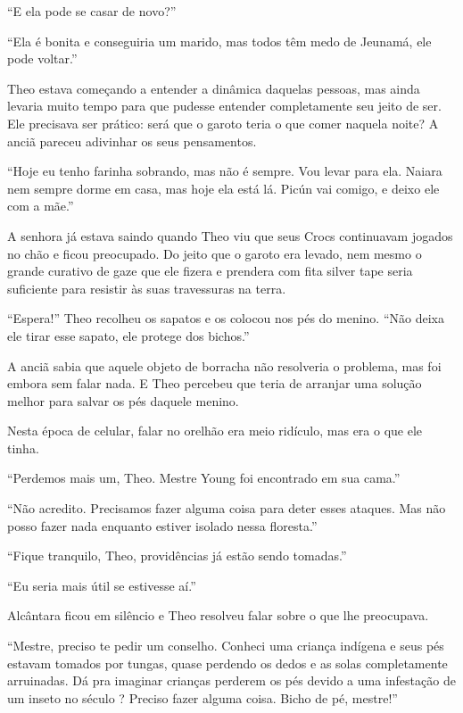 ``E ela pode se casar de novo?''

``Ela é bonita e conseguiria um marido, mas todos têm medo de Jeunamá,
ele pode voltar.''

Theo estava começando a entender a dinâmica daquelas pessoas, mas ainda
levaria muito tempo para que pudesse entender completamente seu jeito de
ser. Ele precisava ser prático: será que o garoto teria o que comer
naquela noite? A anciã pareceu adivinhar os seus pensamentos.

``Hoje eu tenho farinha sobrando, mas não é sempre. Vou levar para ela.
Naiara nem sempre dorme em casa, mas hoje ela está lá. Picún vai comigo,
e deixo ele com a mãe.''

A senhora já estava saindo quando Theo viu que seus Crocs continuavam
jogados no chão e ficou preocupado. Do jeito que o garoto era levado,
nem mesmo o grande curativo de gaze que ele fizera e prendera com fita
silver tape seria suficiente para resistir às suas travessuras na terra.

``Espera!'' Theo recolheu os sapatos e os colocou nos pés do menino.
``Não deixa ele tirar esse sapato, ele protege dos bichos.''

A anciã sabia que aquele objeto de borracha não resolveria o problema,
mas foi embora sem falar nada. E Theo percebeu que teria de arranjar uma
solução melhor para salvar os pés daquele menino.

\asterisc


Nesta época de celular, falar no orelhão era meio ridículo, mas era o
que ele tinha.

``Perdemos mais um, Theo. Mestre Young foi encontrado em sua cama.''

``Não acredito. Precisamos fazer alguma coisa para deter esses ataques.
Mas não posso fazer nada enquanto estiver isolado nessa floresta.''

``Fique tranquilo, Theo, providências já estão sendo tomadas.''

``Eu seria mais útil se estivesse aí.''

Alcântara ficou em silêncio e Theo resolveu falar sobre o que lhe
preocupava.

``Mestre, preciso te pedir um conselho. Conheci uma criança indígena e
seus pés estavam tomados por tungas, quase perdendo os dedos e as solas
completamente arruinadas. Dá pra imaginar crianças perderem os pés
devido a uma infestação de um inseto no século ? Preciso fazer
alguma coisa. Bicho de pé, mestre!''


